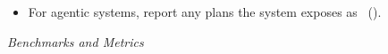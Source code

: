 \begin{itemize}[label={},leftmargin=*]
    \item \iconS {} For agentic systems, report any plans the system exposes as \supplementarymaterial~().
\end{itemize}

\noindent\textit{Benchmarks and Metrics}
